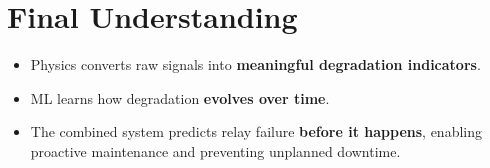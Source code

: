 \documentclass[12pt]{article}
\begin{document}

\section{Final Understanding}

\begin{itemize}
  \item Physics converts raw signals into \textbf{meaningful degradation indicators}.
  \item ML learns how degradation \textbf{evolves over time}.
  \item The combined system predicts relay failure \textbf{before it happens}, enabling proactive maintenance and preventing unplanned downtime.
\end{itemize}
\end{document}
